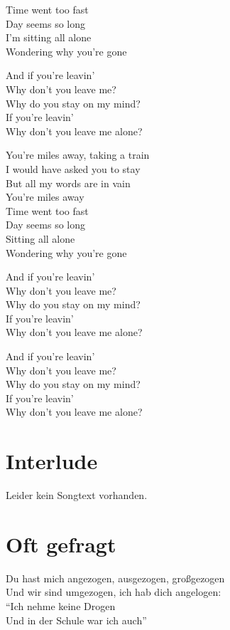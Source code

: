 \documentclass[]{book}
\begin{document}
Time went too fast\\
Day seems so long\\
I'm sitting all alone\\
Wondering why you're gone

And if you're leavin'\\
Why don't you leave me?\\
Why do you stay on my mind?\\
If you're leavin'\\
Why don't you leave me alone?

You're miles away, taking a train\\
I would have asked you to stay\\
But all my words are in vain\\
You're miles away\\
Time went too fast\\
Day seems so long\\
Sitting all alone\\
Wondering why you're gone

And if you're leavin'\\
Why don't you leave me?\\
Why do you stay on my mind?\\
If you're leavin'\\
Why don't you leave me alone?

And if you're leavin'\\
Why don't you leave me?\\
Why do you stay on my mind?\\
If you're leavin'\\
Why don't you leave me alone?

\hypertarget{interlude}{%
\section{Interlude}\label{interlude}}

Leider kein Songtext vorhanden.

\hypertarget{oft-gefragt-3}{%
\section{Oft gefragt}\label{oft-gefragt-3}}

Du hast mich angezogen, ausgezogen, großgezogen\\
Und wir sind umgezogen, ich hab dich angelogen:\\
``Ich nehme keine Drogen\\
Und in der Schule war ich auch''
\end{document}
